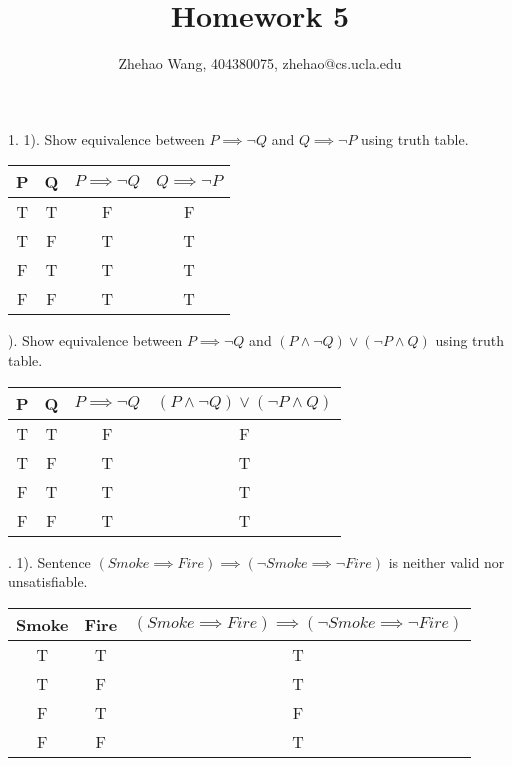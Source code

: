 \documentclass{article}
\title{Homework 5}
\author{Zhehao Wang, 404380075, zhehao@cs.ucla.edu}
\begin{document}
\maketitle

1.
1). Show equivalence between $P \implies \neg Q$ and $Q \implies \neg P$ using truth table.

\begin{center}
  \begin{tabular}{ c | c | c | c }
    \hline
    P & Q & $P \implies \neg Q$ & $Q \implies \neg P$ \\ \hline
    T & T & F & F \\ \hline
    T & F & T & T \\ \hline
    F & T & T & T \\ \hline
    F & F & T & T \\
    \hline
  \end{tabular}
\end{center}

). Show equivalence between $P \implies \neg Q$ and $(P \wedge \neg Q) \vee (\neg P \wedge Q)$ using truth table.

\begin{center}
  \begin{tabular}{ c | c | c | c }
    \hline
    P & Q & $P \implies \neg Q$ & $(P \wedge \neg Q) \vee (\neg P \wedge Q)$ \\ \hline
    T & T & F & F \\ \hline
    T & F & T & T \\ \hline
    F & T & T & T \\ \hline
    F & F & T & T \\
    \hline
  \end{tabular}
\end{center}

.
1). Sentence $(Smoke \implies Fire) \implies (\neg Smoke \implies \neg Fire)$ is neither valid nor unsatisfiable.

\begin{center}
  \begin{tabular}{ c | c | c }
    \hline
    Smoke & Fire & $(Smoke \implies Fire) \implies (\neg Smoke \implies \neg Fire)$ \\ \hline
    T & T & T \\ \hline
    T & F & T \\ \hline
    F & T & F \\ \hline
    F & F & T \\
    \hline
  \end{tabular}
\end{center}
\end{document}
